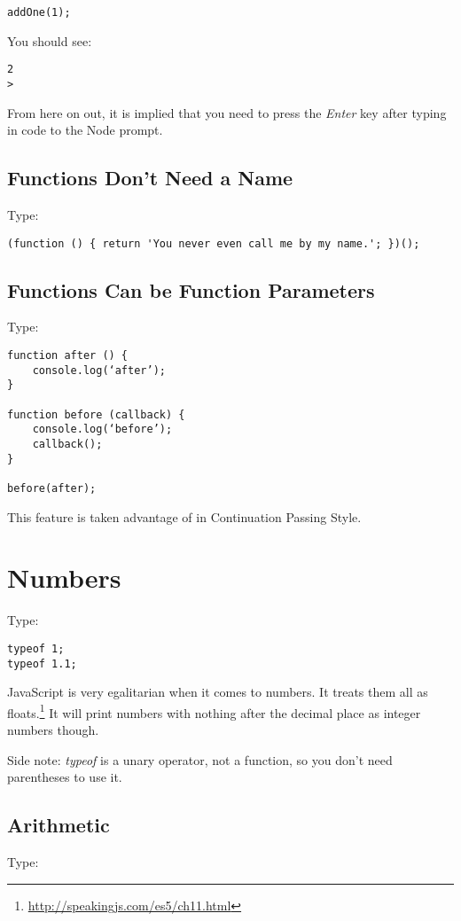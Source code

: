 \documentclass{article}
\begin{document}
\begin{lstlisting}
addOne(1);
\end{lstlisting}

You should see:

\begin{lstlisting}
2
>
\end{lstlisting}

From here on out, it is implied that you need to press the \emph{Enter} key after typing in code to the Node prompt.

\subsection{Functions Don't Need a Name}
Type:

\begin{lstlisting}
(function () { return 'You never even call me by my name.'; })();
\end{lstlisting}

\subsection{Functions Can be Function Parameters}
Type:

\begin{lstlisting}
function after () {
    console.log(‘after’);
}

function before (callback) {
    console.log(‘before’);
    callback();
}

before(after);
\end{lstlisting}

This feature is taken advantage of in Continuation Passing Style.

\section{Numbers}
Type:

\begin{lstlisting}
typeof 1;
typeof 1.1;
\end{lstlisting}

JavaScript is very egalitarian when it comes to numbers. It treats them all as floats.\footnote{\url{http://speakingjs.com/es5/ch11.html}} It will print numbers with nothing after the decimal place as integer numbers though.

Side note: \emph{typeof} is a unary operator, not a function, so you don't need parentheses to use it.

\subsection{Arithmetic}
Type:
\end{document}

